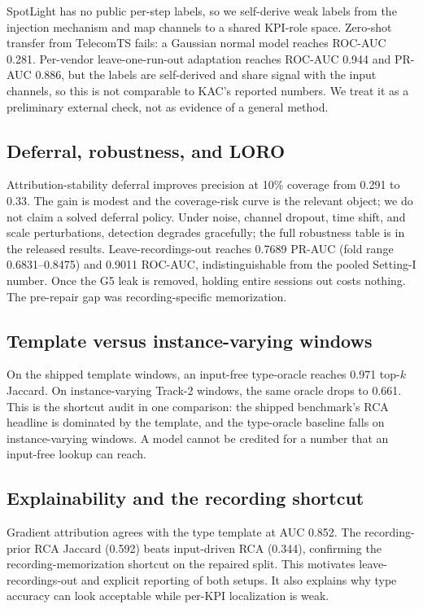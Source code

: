 \documentclass[conference]{IEEEtran}
\begin{document}
SpotLight has no public per-step labels, so we self-derive weak labels from the injection mechanism and map channels to a shared KPI-role space. Zero-shot transfer from TelecomTS fails: a Gaussian normal model reaches ROC-AUC 0.281. Per-vendor leave-one-run-out adaptation reaches ROC-AUC 0.944 and PR-AUC 0.886, but the labels are self-derived and share signal with the input channels, so this is not comparable to KAC's reported numbers. We treat it as a preliminary external check, not as evidence of a general method.

\subsection{Deferral, robustness, and LORO}

Attribution-stability deferral improves precision at 10\% coverage from 0.291 to 0.33. The gain is modest and the coverage-risk curve is the relevant object; we do not claim a solved deferral policy. Under noise, channel dropout, time shift, and scale perturbations, detection degrades gracefully; the full robustness table is in the released results. Leave-recordings-out reaches 0.7689 PR-AUC (fold range 0.6831--0.8475) and 0.9011 ROC-AUC, indistinguishable from the pooled Setting-I number. Once the G5 leak is removed, holding entire sessions out costs nothing. The pre-repair gap was recording-specific memorization.

\subsection{Template versus instance-varying windows}

On the shipped template windows, an input-free type-oracle reaches 0.971 top-$k$ Jaccard. On instance-varying Track-2 windows, the same oracle drops to 0.661. This is the shortcut audit in one comparison: the shipped benchmark's RCA headline is dominated by the template, and the type-oracle baseline falls on instance-varying windows. A model cannot be credited for a number that an input-free lookup can reach.

\subsection{Explainability and the recording shortcut}

Gradient attribution agrees with the type template at AUC 0.852. The recording-prior RCA Jaccard (0.592) beats input-driven RCA (0.344), confirming the recording-memorization shortcut on the repaired split. This motivates leave-recordings-out and explicit reporting of both setups. It also explains why type accuracy can look acceptable while per-KPI localization is weak.
\end{document}
